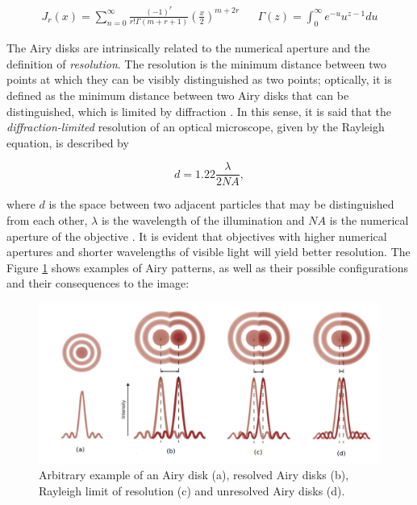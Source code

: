 \begin{align}
\label{eqn:1st_bessel}
J_{r}(x) = \sum_{n = 0}^{\infty}
            \frac{(-1)^{r}}
                 {r! \Gamma(m + r + 1)}
            \left(
                \frac{x}{2}
            \right)^{m + 2r}
&&
\Gamma(z) = \int_{0}^{\infty} e^{-u} u^{z-1}du
\end{align}

The Airy disks are intrinsically related to the numerical aperture and the definition of \emph{resolution}. The resolution is the minimum distance between two points at which they can be visibly distinguished as two points; optically, it is defined as the minimum distance between two Airy disks that can be distinguished, which is limited by diffraction \cite{leng2009materials}. In this sense, it is said that the \emph{diffraction-limited} resolution of an optical microscope, given by the Rayleigh equation, is described by

\begin{equation}
\label{eqn:resolution}
d = 1.22 \frac{\lambda}{2 NA},
\end{equation}

\noindent where $d$ is the space between two adjacent particles that may be distinguished from each other, $\lambda$ is the wavelength of the illumination and $NA$ is the numerical aperture of the objective \cite{davidson2002optical}. It is evident that objectives with higher numerical apertures and shorter wavelengths of visible light will yield better resolution. The Figure \ref{fig:airy_disks} shows examples of Airy patterns, as well as their possible configurations and their consequences to the image:

\begin{figure}[htb]
	\centering
	\caption{\label{fig:airy_disks} Arbitrary example of an Airy disk (a), resolved Airy disks (b), Rayleigh limit of resolution (c) and unresolved Airy disks (d).} 
	\begin{center}
	    \includegraphics[scale=0.4]{images/airy_disks.png}
	\end{center}
	\centering
\end{figure}

